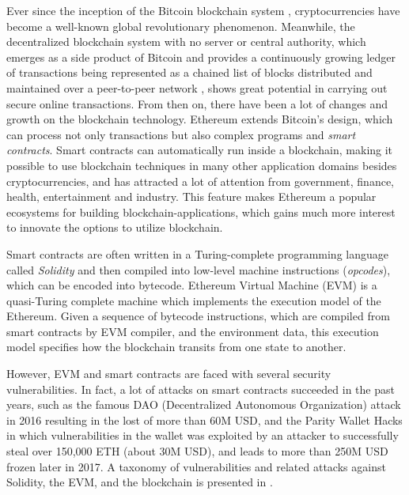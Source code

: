 \documentclass[runningheads]{llncs}
\begin{document}
Ever since the inception of the Bitcoin blockchain system \cite{nakamoto2008bitcoin}, cryptocurrencies have become a well-known global revolutionary phenomenon. Meanwhile, the decentralized blockchain system with no server or central authority, which emerges as a side product of Bitcoin and provides a continuously growing ledger of transactions being represented as a chained list of blocks distributed and maintained over a peer-to-peer network \cite{ZXDCW18}, shows great potential in carrying out secure online transactions. From then on, there have been a lot of changes and growth on the blockchain technology. %
Ethereum \cite{Ethereum} extends Bitcoin's design, which can process not only transactions but also complex programs and {\em smart contracts}. Smart contracts can automatically run inside a blockchain, 
making it possible to use blockchain techniques in many other application domains besides cryptocurrencies, and has attracted a lot of attention from government, finance, health, entertainment and industry. This feature makes Ethereum a popular ecosystems for building blockchain-applications, which gains much more interest to innovate the options to utilize blockchain. 

Smart contracts are often written in a Turing-complete programming language called \textit{Solidity} \cite{solidity} and then compiled into low-level machine instructions (\textit{opcodes}), which can be encoded into bytecode. Ethereum Virtual Machine (EVM) is a quasi-Turing complete machine which implements the execution model of the Ethereum. Given a sequence of bytecode instructions, which are compiled from smart contracts by EVM compiler, and the environment data, this execution model specifies how the blockchain transits from one state to another. 

However, EVM and smart contracts are faced with several security vulnerabilities. In fact, a lot of attacks on smart contracts succeeded in the past years, such as the famous DAO (Decentralized Autonomous Organization) attack in 2016 resulting in the lost of more than 60M USD, and the Parity Wallet Hacks in which vulnerabilities in the wallet was exploited by an attacker to successfully steal over 150,000 ETH (about 30M USD), and leads to more than 250M USD frozen later in 2017. A taxonomy of vulnerabilities and related attacks against Solidity, the EVM, and the blockchain is presented in \cite{atzei2016survey}. 
\end{document}
